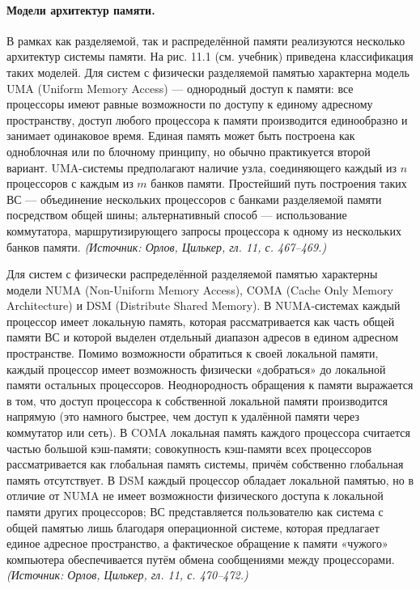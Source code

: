 \documentclass[a4paper,12pt]{article}
\begin{document}
\paragraph{Модели архитектур памяти.}
В рамках как разделяемой, так и распределённой памяти реализуются несколько архитектур системы памяти. На рис. 11.1 (см. учебник) приведена классификация таких моделей. Для систем с физически разделяемой памятью характерна модель UMA (Uniform Memory Access) — однородный доступ к памяти: все процессоры имеют равные возможности по доступу к единому адресному пространству, доступ любого процессора к памяти производится единообразно и занимает одинаковое время. Единая память может быть построена как одноблочная или по блочному принципу, но обычно практикуется второй вариант. UMA-системы предполагают наличие узла, соединяющего каждый из \(n\) процессоров с каждым из \(m\) банков памяти. Простейший путь построения таких ВС — объединение нескольких процессоров с банками разделяемой памяти посредством общей шины; альтернативный способ — использование коммутатора, маршрутизирующего запросы процессора к одному из нескольких банков памяти.
\textit{(Источник: Орлов, Цилькер, гл. 11, с. 467--469.)}

Для систем с физически распределённой разделяемой памятью характерны модели NUMA (Non-Uniform Memory Access), COMA (Cache Only Memory Architecture) и DSM (Distribute Shared Memory). В NUMA-системах каждый процессор имеет локальную память, которая рассматривается как часть общей памяти ВС и которой выделен отдельный диапазон адресов в едином адресном пространстве. Помимо возможности обратиться к своей локальной памяти, каждый процессор имеет возможность физически «добраться» до локальной памяти остальных процессоров. Неоднородность обращения к памяти выражается в том, что доступ процессора к собственной локальной памяти производится напрямую (это намного быстрее, чем доступ к удалённой памяти через коммутатор или сеть). В COMA локальная память каждого процессора считается частью большой кэш-памяти; совокупность кэш-памяти всех процессоров рассматривается как глобальная память системы, причём собственно глобальная память отсутствует. В DSM каждый процессор обладает локальной памятью, но в отличие от NUMA не имеет возможности физического доступа к локальной памяти других процессоров; ВС представляется пользователю как система с общей памятью лишь благодаря операционной системе, которая предлагает единое адресное пространство, а фактическое обращение к памяти «чужого» компьютера обеспечивается путём обмена сообщениями между процессорами.
\textit{(Источник: Орлов, Цилькер, гл. 11, с. 470--472.)}
\end{document}

